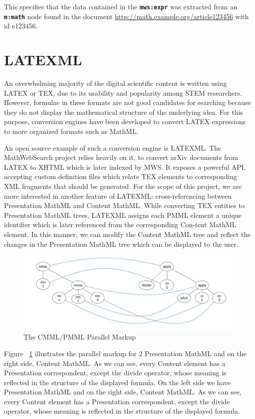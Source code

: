 \documentclass{deliverablereport}
\begin{document}
This specifies that the data contained in the \textbf{\texttt{mws:expr}} was extracted from an \textbf{\texttt{m:math}} node found in the document \url{http://math.example.org/article123456} with id e123456.

\section{LATEXML}\label{sec:ml}
An overwhelming majority of the digital scientific content is written using LATEX or TEX, due to its usability and popularity among STEM researchers. However, formulae in these formats are not good candidates for searching because they do not display the mathematical
structure of the underlying idea. For this purpose, conversion engines have been developed to convert LATEX expressions to more organized formats such as MathML. ~\cite{Ham:bcs15}

An open source example of such a conversion engine is LATEXML. The MathWebSearch project relies heavily on it, to convert arXiv documents from LATEX to XHTML which is later indexed by MWS. It exposes a powerful API, accepting custom definition files which relate TEX elements to corresponding XML fragments that should be generated. For the scope of this project, we are more interested in another feature of LATEXML: cross-referencing between Presentation MathML and Content MathML. While converting TEX entities to Presentation MathML trees, LATEXML assigns each PMML element a unique identifier which is later referenced from the corresponding Con-tent MathML element. In this manner, we can modify the Content MathML tree and reflect the changes in the Presentation MathML tree which can be displayed to the user.
 

\begin{figure}[h]
\centering
 \includegraphics[scale=0.8]{figure2.jpg}
 \caption{The CMML/PMML Parallel Markup}
 \label{fig:markup}
\end{figure}

Figure ~\ref{fig:markup} illustrates the parallel markup for 2 Presentation MathML and on the right side,
Content MathML. As we can see, every Content element has a Presentation correspondent,
except the divide operator, whose meaning is reflected in the structure of the displayed
formula. On the left side we have Presentation MathML and on the right side, Content
MathML. As we can see, every Content element has a Presentation correspondent, except the
divide operator, whose meaning is reflected in the structure of the displayed formula.
\end{document}

